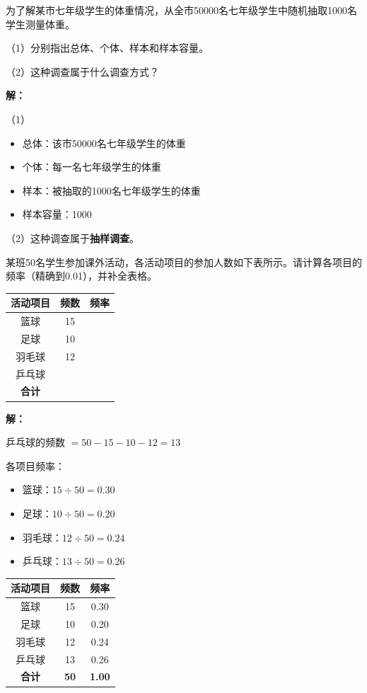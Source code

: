 \documentclass[12pt, a4paper]{ctexart}
\begin{document}
\begin{examplebox}
为了解某市七年级学生的体重情况，从全市50000名七年级学生中随机抽取1000名学生测量体重。

（1）分别指出总体、个体、样本和样本容量。

（2）这种调查属于什么调查方式？

\textbf{解：}

（1）
\begin{itemize}[leftmargin=2em]
  \item 总体：该市50000名七年级学生的体重
  \item 个体：每一名七年级学生的体重
  \item 样本：被抽取的1000名七年级学生的体重
  \item 样本容量：1000
\end{itemize}

（2）这种调查属于\textbf{抽样调查}。
\end{examplebox}

\begin{examplebox}[【例题2】频率与频数的计算]
某班50名学生参加课外活动，各活动项目的参加人数如下表所示。请计算各项目的频率（精确到0.01），并补全表格。

\begin{center}
\begin{tabular}{|c|c|c|}
\hline
活动项目 & 频数 & 频率 \\
\hline
篮球 & 15 & \\
\hline
足球 & 10 & \\
\hline
羽毛球 & 12 & \\
\hline
乒乓球 & & \\
\hline
\textbf{合计} & & \\
\hline
\end{tabular}
\end{center}

\textbf{解：}

乒乓球的频数 $= 50 - 15 - 10 - 12 = 13$

各项目频率：
\begin{itemize}[leftmargin=2em]
  \item 篮球：$15 \div 50 = 0.30$
  \item 足球：$10 \div 50 = 0.20$
  \item 羽毛球：$12 \div 50 = 0.24$
  \item 乒乓球：$13 \div 50 = 0.26$
\end{itemize}

\begin{center}
\begin{tabular}{|c|c|c|}
\hline
活动项目 & 频数 & 频率 \\
\hline
篮球 & 15 & 0.30 \\
\hline
足球 & 10 & 0.20 \\
\hline
羽毛球 & 12 & 0.24 \\
\hline
乒乓球 & 13 & 0.26 \\
\hline
\textbf{合计} & \textbf{50} & \textbf{1.00} \\
\hline
\end{tabular}
\end{center}
\end{examplebox}
\end{document}
